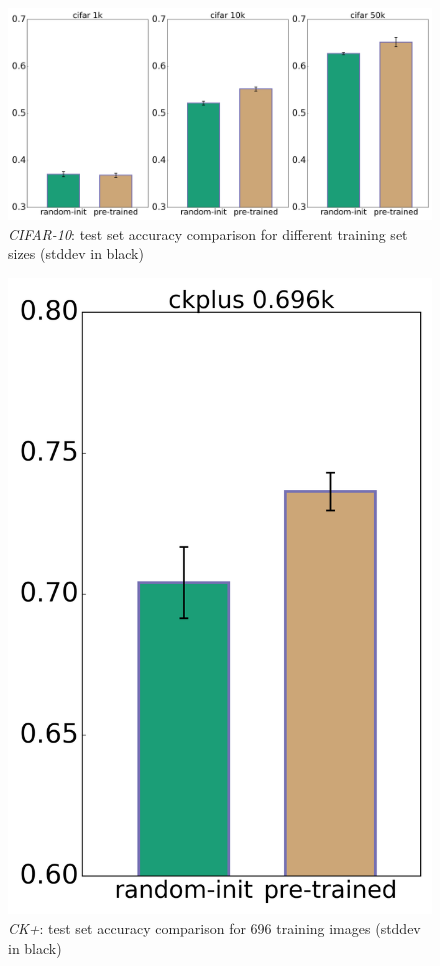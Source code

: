 \documentclass{article}
\begin{document}
    \begin{figure}
      \includegraphics[width=\linewidth]{../box_plots/boxplots_cifar.png}
      \caption{\emph{CIFAR-10}: test set accuracy comparison for different training set sizes (stddev in black)}
      \label{fig:cifar_plot}
    \end{figure}

    \begin{figure}
      \centering
      \includegraphics[width=0.33\linewidth]{../box_plots/boxplots_ckplus.png}
      \caption{\emph{CK+}: test set accuracy comparison for 696 training images (stddev in black)}
      \label{fig:ckplus_plot}
    \end{figure}
\end{document}
